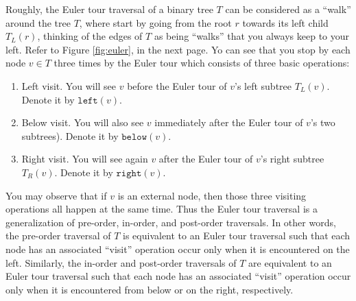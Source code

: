 \documentclass{article}
\begin{document}
Roughly, the Euler tour traversal of a binary tree $T$ can be considered as a ``walk'' around the tree $T$,
where start by going from the root $r$ towards its left child $T_L(r)$, thinking of the edges of $T$ as being 
``walks'' that you always keep to your left. Refer to Figure \ref{fig:euler}, in the next page. 
Yo can see that you stop by each node $v\in T$ three times by the Euler tour which consists of three basic operations:
\begin{enumerate}
\item Left visit. You will see $v$ before the Euler tour of $v$'s left subtree $T_L(v)$. Denote it by $\mathtt{left}(v)$.
\item Below visit. You will also see $v$ immediately after the Euler tour of $v$'s two subtrees). Denote it by $\mathtt{below}(v)$.
\item Right visit. You will see again $v$ after the Euler tour of $v$'s right subtree $T_R(v)$. Denote it by  $\mathtt{right}(v)$.
\end{enumerate}

You may observe that if $v$ is an external node, then those three visiting operations all happen at the same time.
Thus the Euler tour traversal is a generalization of pre-order, in-order, and post-order traversals. 
In other words, the pre-order traversal of $T$ is equivalent to an Euler tour traversal such that
each node has an associated ``visit'' operation occur only when 
it is encountered on the left.
Similarly, the in-order and post-order traversals of $T$ are equivalent to an Euler tour traversal such that 
each node has an associated ``visit'' operation occur only when it is encountered from below or on the right, respectively.
 
\end{document}
